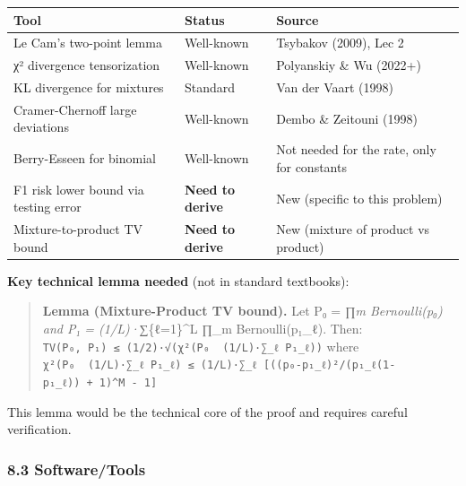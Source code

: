\documentclass[
  12pt,
]{article}
\begin{document}
\begin{longtable}[]{@{}
  >{\raggedright\arraybackslash}p{}
  >{\raggedright\arraybackslash}p{}
  >{\raggedright\arraybackslash}p{}@{}}
\toprule\noalign{}
\begin{minipage}[b]{\linewidth}\raggedright
Tool
\end{minipage} & \begin{minipage}[b]{\linewidth}\raggedright
Status
\end{minipage} & \begin{minipage}[b]{\linewidth}\raggedright
Source
\end{minipage} \\
\midrule\noalign{}
\endhead
\bottomrule\noalign{}
\endlastfoot
Le Cam's two-point lemma & Well-known & Tsybakov (2009), Lec 2 \\
χ² divergence tensorization & Well-known & Polyanskiy \& Wu (2022+) \\
KL divergence for mixtures & Standard & Van der Vaart (1998) \\
Cramer-Chernoff large deviations & Well-known & Dembo \& Zeitouni
(1998) \\
Berry-Esseen for binomial & Well-known & Not needed for the rate, only
for constants \\
F1 risk lower bound via testing error & \textbf{Need to derive} & New
(specific to this problem) \\
Mixture-to-product TV bound & \textbf{Need to derive} & New (mixture of
product vs product) \\
\end{longtable}

\textbf{Key technical lemma needed} (not in standard textbooks):

\begin{quote}
\textbf{Lemma (Mixture-Product TV bound).} Let P₀ = ∏\emph{m
Bernoulli(p₀) and P₁ = (1/L)·∑}\{ℓ=1\}\^{}L ∏\_m Bernoulli(p₁\_ℓ). Then:
\texttt{TV(P₀,\ P₁)\ ≤\ (1/2)·√(χ²(P₀\ \textbar{}\textbar{}\ (1/L)·∑\_ℓ\ P₁\_ℓ))}
where
\texttt{χ²(P₀\ \textbar{}\textbar{}\ (1/L)·∑\_ℓ\ P₁\_ℓ)\ ≤\ (1/L)·∑\_ℓ\ {[}((p₀-p₁\_ℓ)²/(p₁\_ℓ(1-p₁\_ℓ))\ +\ 1)\^{}M\ -\ 1{]}}
\end{quote}

This lemma would be the technical core of the proof and requires careful
verification.

\subsubsection{8.3 Software/Tools}\label{softwaretools}
\end{document}
